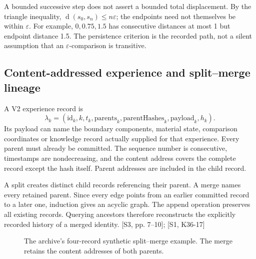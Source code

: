 \documentclass[11pt,a4paper]{article}
\numberwithin{equation}{section}
\newcommand{\src}[2]{{\sffamily\small\color{slate}[#1, #2]}}
\begin{document}
A bounded successive step does not assert a bounded total displacement. By the triangle inequality, $\operatorname d(s_0,s_n)\le n\varepsilon$; the endpoints need not themselves be within $\varepsilon$. For example, $0,0.75,1.5$ has consecutive distances at most 1 but endpoint distance 1.5. The persistence criterion is the recorded path, not a silent assumption that an $\varepsilon$-comparison is transitive.

\subsection{Content-addressed experience and split--merge lineage}
A V2 experience record is
\begin{equation}
\lambda_k=(\mathrm{id}_k,k,t_k,\mathrm{parents}_k,
\mathrm{parentHashes}_k,\mathrm{payload}_k,h_k).
\end{equation}
Its payload can name the boundary components, material state, comparison coordinates or knowledge record actually supplied for that experience. Every parent must already be committed. The sequence number is consecutive, timestamps are nondecreasing, and the content address covers the complete record except the hash itself. Parent addresses are included in the child record.

A split creates distinct child records referencing their parent. A merge names every retained parent. Since every edge points from an earlier committed record to a later one, induction gives an acyclic graph. The append operation preserves all existing records. Querying ancestors therefore reconstructs the explicitly recorded history of a merged identity. \src{S3}{pp. 7--10}; \src{S1}{K36-17}

\begin{figure}[H]\centering
{}
\caption{The archive's four-record synthetic split--merge example. The merge retains the content addresses of both parents.}
\end{figure}
\end{document}
